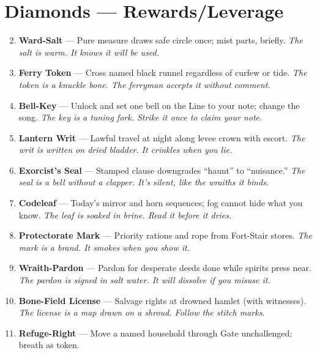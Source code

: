 \section*{Diamonds --- Rewards/Leverage}
\label{sec:mistlands-rewards}
\begin{enumerate}
\setcounter{enumi}{1}
\item \textbf{Ward-Salt} --- Pure measure draws safe circle once; mist parts, briefly. 
  \hfill \textit{The salt is warm. It knows it will be used.}
\item \textbf{Ferry Token} --- Cross named black runnel regardless of curfew or tide. 
  \hfill \textit{The token is a knuckle bone. The ferryman accepts it without comment.}
\item \textbf{Bell-Key} --- Unlock and set one bell on the Line to your note; change the song. 
  \hfill \textit{The key is a tuning fork. Strike it once to claim your note.}
\item \textbf{Lantern Writ} --- Lawful travel at night along levee crown with escort.  
  \hfill \textit{The writ is written on dried bladder. It crinkles when you lie.}
\item \textbf{Exorcist's Seal} --- Stamped clause downgrades ``haunt'' to ``nuisance.'' 
  \hfill \textit{The seal is a bell without a clapper. It's silent, like the wraiths it binds.}
\item \textbf{Codeleaf} --- Today's mirror and horn sequences; fog cannot hide what you know. 
  \hfill \textit{The leaf is soaked in brine. Read it before it dries.}
\item \textbf{Protectorate Mark} --- Priority rations and rope from Fort-Stair stores. 
  \hfill \textit{The mark is a brand. It smokes when you show it.}
\item \textbf{Wraith-Pardon} --- Pardon for desperate deeds done while spirits press near. 
  \hfill \textit{The pardon is signed in salt water. It will dissolve if you misuse it.}
\item \textbf{Bone-Field License} --- Salvage rights at drowned hamlet (with witnesses). 
  \hfill \textit{The license is a map drawn on a shroud. Follow the stitch marks.}
\item[J] \textbf{Refuge-Right} --- Move a named household through Gate unchallenged; breath as token. 

\end{enumerate}
